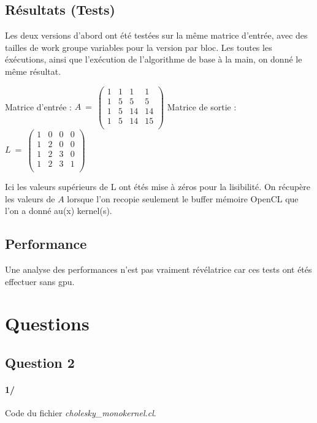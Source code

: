 \documentclass[paper=a4, fontsize=11pt]{scrartcl} %
\numberwithin{equation}{section} %
\numberwithin{figure}{section} %
\numberwithin{table}{section} %
\begin{document}
\subsection{Résultats (Tests)}
Les deux versions d'abord ont été testées sur la même matrice
d'entrée, avec des tailles de work groupe variables pour la version
par bloc. Les toutes les éxécutions, ainsi que l'exécution de
l'algorithme de base à la main, on donné le même résultat.

\begin{centering}
Matrice d'entrée : $A\ =\ \left( \begin{array}{cccc}
1&1&1&1 \\
1&5&5&5 \\
1&5&14&14 \\
1&5&14&15 \\
\end{array} \right) $
Matrice de sortie : $L\ =\ \left( \begin{array}{cccc}
1&0&0&0 \\
1&2&0&0 \\
1&2&3&0 \\
1&2&3&1 \\
\end{array} \right) $
\end{centering}

Ici les valeurs supérieurs de L ont étés mise à zéros pour la
lisibilité. On récupère les valeurs de $A$ lorsque l'on recopie
seulement le buffer mémoire OpenCL que l'on a donné au(x) kernel(s).


\subsection{Performance}
Une analyse des performances n'est pas vraiment révélatrice car ces
tests ont étés effectuer sans gpu. 

\section{Questions}

\subsection{Question 2}

\paragraph{1/} Code du fichier \textit{cholesky\_monokernel.cl}.\\
\end{document}
